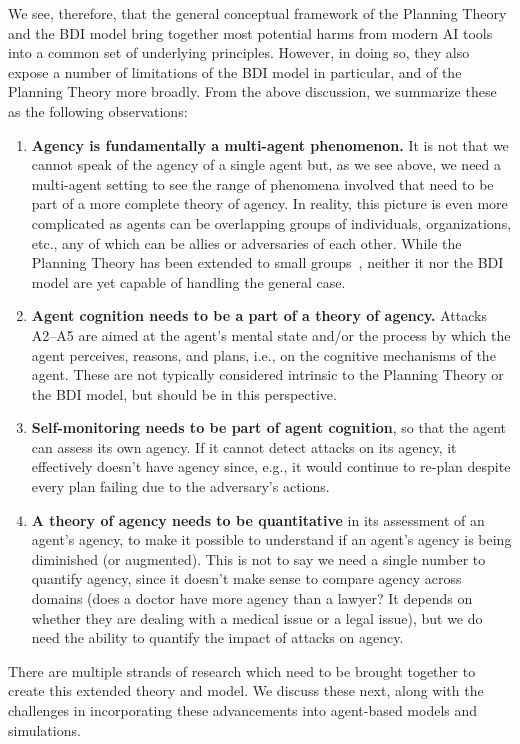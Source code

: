 We see, therefore, that the general conceptual framework of the Planning Theory and the BDI model bring together most potential harms from 
modern AI tools into a common set of underlying principles. However, in doing so, they also expose a number of limitations of the BDI model in 
particular, and of the Planning Theory more broadly. From the above discussion, we summarize these as the following observations:
\begin{enumerate}[nolistsep,label=(O\arabic*)]
    \item \textbf{Agency is fundamentally a multi-agent phenomenon.} It is not that we cannot speak of the agency of a single agent but, as we 
    see above, we need a multi-agent setting to see the range of phenomena involved that need to be part of a more complete theory of agency. In 
    reality, this picture is even more complicated as agents can be overlapping groups of individuals, organizations, etc., any of which can be 
    allies or adversaries of each other. While the Planning Theory has been extended to small groups~\citep{bratman13shared_agency}, neither it 
    nor the BDI model are yet capable of handling the general case.
    \item \textbf{Agent cognition needs to be a part of a theory of agency.} Attacks A2--A5 are aimed at the agent's mental state and/or the 
    process by which the agent perceives, reasons, and plans, i.e., on the cognitive mechanisms of the agent. These are not typically
    considered intrinsic to the Planning Theory or the BDI model, but should be in this perspective.
    \item \textbf{Self-monitoring needs to be part of agent cognition}, so that the agent can assess its own agency. If it cannot detect
    attacks on its agency, it effectively doesn't have agency since, e.g., it would continue to re-plan despite every plan failing due to
    the adversary's actions.
    \item \textbf{A theory of agency needs to be quantitative} in its assessment of an agent's agency, to make it
    possible to understand if an agent's agency is being diminished (or augmented). This is not to say we need a single
    number to quantify agency, since it doesn't make sense to compare agency across domains (does a doctor have more agency than a lawyer? It 
    depends on whether they are dealing with a medical issue or a legal issue), but we do need the ability to quantify the impact of attacks
    on agency.
\end{enumerate}

There are multiple strands of research which need to be brought together to create this extended theory and model. We discuss these next,
along with the challenges in incorporating these advancements into agent-based models and simulations.